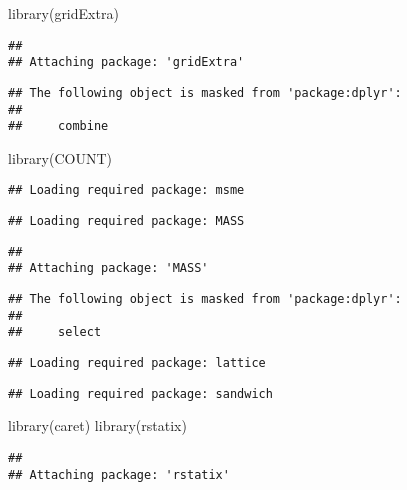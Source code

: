 \documentclass[
]{article}
\newenvironment{Shaded}{\begin{snugshade}}{\end{snugshade}}
\newcommand{\FunctionTok}[1]{\textcolor[rgb]{0.00,0.00,0.00}{#1}}
\newcommand{\NormalTok}[1]{#1}
\begin{document}
\begin{Shaded}
\begin{Highlighting}[]
\FunctionTok{library}\NormalTok{(gridExtra)}
\end{Highlighting}
\end{Shaded}

\begin{verbatim}
## 
## Attaching package: 'gridExtra'
\end{verbatim}

\begin{verbatim}
## The following object is masked from 'package:dplyr':
## 
##     combine
\end{verbatim}

\begin{Shaded}
\begin{Highlighting}[]
\FunctionTok{library}\NormalTok{(COUNT)}
\end{Highlighting}
\end{Shaded}

\begin{verbatim}
## Loading required package: msme
\end{verbatim}

\begin{verbatim}
## Loading required package: MASS
\end{verbatim}

\begin{verbatim}
## 
## Attaching package: 'MASS'
\end{verbatim}

\begin{verbatim}
## The following object is masked from 'package:dplyr':
## 
##     select
\end{verbatim}

\begin{verbatim}
## Loading required package: lattice
\end{verbatim}

\begin{verbatim}
## Loading required package: sandwich
\end{verbatim}

\begin{Shaded}
\begin{Highlighting}[]
\FunctionTok{library}\NormalTok{(caret)}
\FunctionTok{library}\NormalTok{(rstatix)}
\end{Highlighting}
\end{Shaded}

\begin{verbatim}
## 
## Attaching package: 'rstatix'
\end{verbatim}
\end{document}
